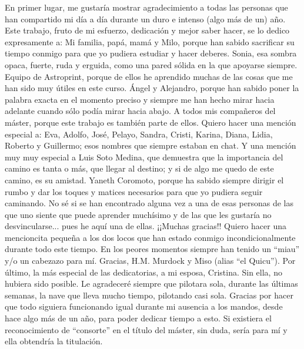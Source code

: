 
\cleardoublepage

\vspace{15ex}


En primer lugar, me gustaría mostrar agradecimiento a todas las personas que han compartido mi día a día durante un duro e intenso (algo más de un) año.
\newline
Este trabajo, fruto de mi esfuerzo, dedicación y mejor saber hacer, se lo dedico expresamente a:
\newline
Mi familia, papá, mamá y Milo, porque han sabido sacrificar su tiempo conmigo para que yo pudiera estudiar y hacer deberes.
\newline
Sonia, esa sombra opaca, fuerte, ruda y erguida, como una pared sólida en la que apoyarse siempre.
\newline
Equipo de Astroprint, porque de ellos he aprendido muchas de las cosas que me han sido muy útiles en este curso.
\newline
Ángel y Alejandro, porque han sabido poner la palabra exacta en el momento preciso y siempre me han hecho mirar hacia adelante cuando sólo podía mirar hacia abajo.
\newline
A todos mis compañeros del máster, porque este trabajo es también parte de ellos.
Quiero hacer una mención especial a: Eva, Adolfo, José, Pelayo, Sandra, Cristi, Karina, Diana, Lidia, Roberto y Guillermo; esos nombres que siempre estaban en chat.
Y una mención muy muy especial a Luis Soto Medina, que demuestra que la importancia del camino es tanta o más, que llegar al destino; y si de algo me quedo de este camino, es su amistad.
\newline
Yaneth Coromoto, porque ha sabido siempre dirigir el rumbo y dar los toques y matices necesarios para que yo pudiera seguir caminando. No sé si se han encontrado alguna vez a una de esas personas de las que uno siente que puede aprender muchísimo y de las que les gustaría no desvincularse... pues he aquí una de ellas. ¡¡Muchas gracias!!
\newline
\newline
Quiero hacer una mencioncita pequeña a los dos locos que han estado conmigo incondicionalmente durante todo este tiempo. En los peores momentos siempre han tenido un ``miau'' y/o un cabezazo para mí. Gracias, H.M. Murdock y Miso (alias ``el Quicu'').
\newline
\newline
Por último, la más especial de las dedicatorias, a mi esposa, Cristina. Sin ella, no hubiera sido posible. Le agradeceré siempre que pilotara sola, durante las últimas semanas, la nave que lleva mucho tiempo, pilotando casi sola. Gracias por hacer que todo siguiera funcionando igual durante mi ausencia a los mandos, desde hace algo más de un año, para poder dedicar tiempo a esto. Si existiera el reconocimiento de ``consorte'' en el título del máster, sin duda, sería para mí y ella obtendría la titulación.
